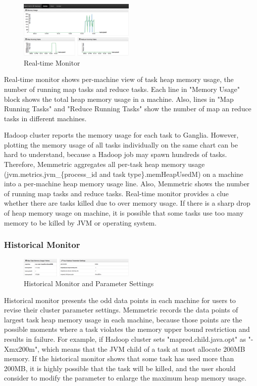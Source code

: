 \begin{figure}[h!]
  \centering
    \includegraphics[width=0.5\textwidth]{image/real-time-monitor.png}
  \caption{Real-time Monitor}
\end{figure}

Real-time monitor shows per-machine view of task heap memory usage, the number of running map tasks and reduce tasks. Each line in "Memory Usage" block shows the total heap memory usage in a machine. Also, lines in "Map Running Tasks" and "Reduce Running Tasks" show the number of map an reduce tasks in different machines.

Hadoop cluster reports the memory usage for each task to Ganglia. However, plotting the memory usage of all tasks individually on the same chart can be hard to understand, because a Hadoop job may spawn hundreds of tasks. Therefore, Memmetric aggregates all per-task heap memory usage (jvm.metrics.jvm\_\{process\_id and task type\}.memHeapUsedM) on a machine into a per-machine heap memory usage line. Also, Memmetric shows the number of running map tasks and reduce tasks. Real-time monitor provides a clue whether there are tasks killed due to over memory usage. If there is a sharp drop of heap memory usage on machine, it is possible that some tasks use too many memory to be killed by JVM or operating system. 

\subsubsection{Historical Monitor}

\begin{figure}[h!]
  \centering
    \includegraphics[width=0.5\textwidth]{image/historical-monitor.png}
  \caption{Historical Monitor and Parameter Settings}
\end{figure}

Historical monitor presents the odd data points in each machine for users to revise their cluster parameter settings. Memmetric records the data points of largest task heap memory usage in each machine, because those points are the possible moments where a task violates the memory upper bound restriction and results in failure. For example, if Hadoop cluster sets "mapred.child.java.opt" as "-Xmx200m", which means that  the JVM child of a task at most allocate 200MB memory. If the historical monitor shows that some task has used more than 200MB, it is highly possible that the task will be killed, and the user should consider to modify the parameter to enlarge the maximum heap memory usage.


